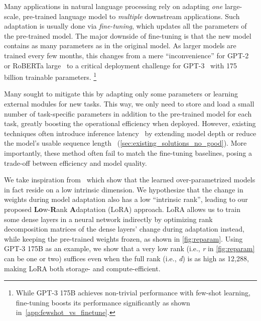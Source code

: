 Many applications in natural language processing rely on adapting \emph{one} large-scale, pre-trained language model to \emph{multiple} downstream applications.
Such adaptation is usually done via \emph{fine-tuning}, which updates all the parameters of the pre-trained model.
The major downside of fine-tuning is that the new model contains as many parameters as in the original model.
As larger models are trained every few months, this changes from a mere ``inconvenience'' for GPT-2~\citep{radford_language_nodate} or RoBERTa large~\citep{liu2019roberta} to a critical deployment challenge for GPT-3~\citep{brown_language_2020} with 175 billion trainable parameters.%
\footnote{While GPT-3 175B achieves non-trivial performance with few-shot learning, fine-tuning boosts its performance significantly as shown in~\autoref{app:fewshot_vs_finetune}.}





Many sought to mitigate this by adapting only some parameters or learning external modules for new tasks.
This way, we only need to store and load a small number of task-specific parameters in addition to the pre-trained model for each task, greatly boosting the operational efficiency when deployed.
However, existing techniques often introduce inference latency~\citep{houlsby_parameter-efficient_2019, rebuffi_learning_2017} by extending model depth or reduce the model's usable sequence length~\citep{li_prefix-tuning_2021, lester_power_2021, hambardzumyan_warp_2020, liu_gpt_2021} (\autoref{sec:existing_solutions_no_good}).
More importantly, these method often fail to match the fine-tuning baselines, posing a trade-off between efficiency and model quality.


We take inspiration from~\cite{li_measuring_2018, aghajanyan_intrinsic_2020} which show that the learned over-parametrized models in fact reside on a low intrinsic dimension.
We hypothesize that the change in weights during model adaptation also has a low ``intrinsic rank'', leading to our proposed \textbf{Lo}w-\textbf{R}ank \textbf{A}daptation (LoRA) approach.
LoRA allows us to train some dense layers in a neural network indirectly by optimizing rank decomposition matrices of the dense layers' change during adaptation instead, while keeping the pre-trained weights frozen, as shown in \autoref{fig:reparam}.
Using GPT-3 175B as an example, we show that a very low rank (i.e., \textit{r} in \autoref{fig:reparam} can be one or two) suffices even when the full rank (i.e., \textit{d}) is as high as 12,288, making LoRA both storage- and compute-efficient.


